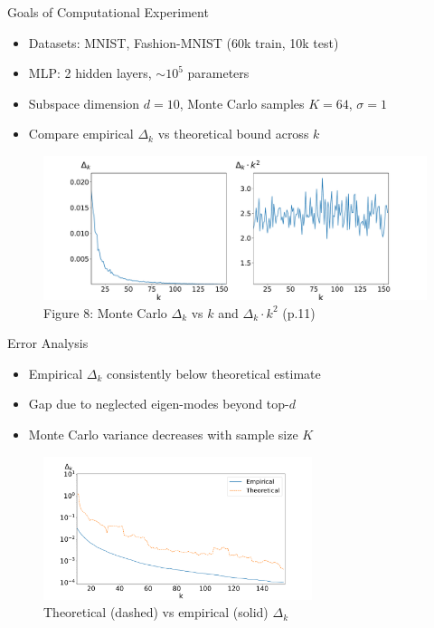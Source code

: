 \documentclass{beamer}
\begin{document}
\begin{frame}{Goals of Computational Experiment}
    \begin{itemize}
        \item Datasets: MNIST, Fashion-MNIST (60k train, 10k test)
        \item MLP: 2 hidden layers, $\sim10^5$ parameters
        \item Subspace dimension $d=10$, Monte Carlo samples $K=64$, $\sigma=1$
        \item Compare empirical $\Delta_k$ vs theoretical bound across $k$
    \end{itemize}

    \begin{figure}
        \centering
        \includegraphics[width=1.05\textwidth,trim=0 17 0 1.5cm,clip]{img/delta_eigen_1_10_1024.pdf}
        \caption*{\tiny Figure 8: Monte Carlo $\Delta_k$ vs $k$ and $\Delta_k\cdot k^2$ (p.11)}
    \end{figure}
\end{frame}

\begin{frame}{Error Analysis}
    \begin{itemize}
        \item Empirical $\Delta_k$ consistently below theoretical estimate
        \item Gap due to neglected eigen-modes beyond top-$d$
        \item Monte Carlo variance decreases with sample size $K$
    \end{itemize}

    \begin{figure}
        \centering
        \includegraphics[width=0.7\textwidth]{img/delta_border_1_10_1024.pdf}
        \caption*{\tiny Theoretical (dashed) vs empirical (solid) $\Delta_k$}
    \end{figure}
\end{frame}
\end{document}
